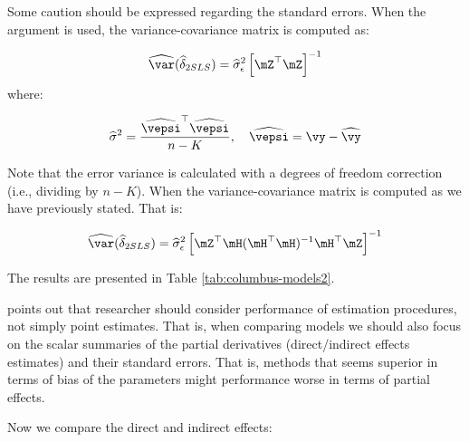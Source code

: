 \documentclass[english,12pt]{book}\usepackage[]{graphicx}\usepackage[]{xcolor}
\begin{document}
Some caution should be expressed regarding the standard errors. When the argument  is used, the variance-covariance matrix is computed as:


\begin{equation*}
\widehat{\var}(\widehat{\delta}_{2SLS}) = \widehat{\sigma}^2_{\epsilon}\left[\mZ^\top\mZ\right]^{-1}
\end{equation*}
%
where:

\begin{equation*}
  \widehat{\sigma}^2 = \frac{\widehat{\vepsi}^\top\widehat{\vepsi}}{n - K},\quad \widehat{\vepsi} = \vy - \widehat{\vy}
\end{equation*}

Note that the error variance is calculated with a degrees of freedom correction (i.e., dividing by $n-K$). When   the variance-covariance matrix is computed as we have previously stated. That is:

\begin{equation*}
\widehat{\var}(\widehat{\delta}_{2SLS}) = \widehat{\sigma}^2_{\epsilon}\left[\mZ^\top \mH (\mH^\top\mH)^{-1}\mH^\top\mZ\right]^{-1}
\end{equation*}

The results are presented in Table \ref{tab:columbus-models2}.

\citet[][pag. 24]{lesage2014regional} points out that researcher should consider performance of estimation procedures, not simply point estimates. That is, when comparing models we should also focus on the scalar summaries of the partial derivatives (direct/indirect effects estimates) and their standard errors. That is, methods that seems superior in terms of bias of the parameters might performance worse in terms of partial effects. 


Now we compare the direct and indirect effects: 
\end{document}
